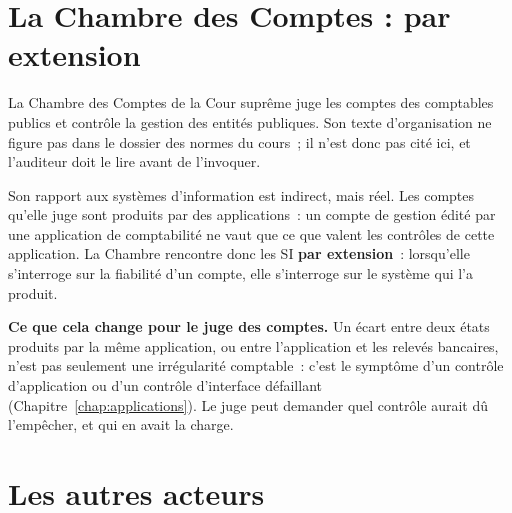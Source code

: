 \separateur

\section{La Chambre des Comptes : par extension}
\label{sec:c04-chambre}

La Chambre des Comptes de la Cour suprême juge les comptes des comptables
publics et contrôle la gestion des entités publiques. Son texte
d'organisation ne figure pas dans le dossier des normes du cours~; il
n'est donc pas cité ici, et l'auditeur doit le lire avant de l'invoquer.

Son rapport aux systèmes d'information est indirect, mais réel. Les
comptes qu'elle juge sont produits par des applications~: un compte de
gestion édité par une application de comptabilité ne vaut que ce que
valent les contrôles de cette application. La Chambre rencontre donc les
SI \textbf{par extension}~: lorsqu'elle s'interroge sur la fiabilité d'un
compte, elle s'interroge sur le système qui l'a produit.

\begin{boxinfo}
\textbf{Ce que cela change pour le juge des comptes.} Un écart entre deux
états produits par la même application, ou entre l'application et les
relevés bancaires, n'est pas seulement une irrégularité comptable~: c'est
le symptôme d'un contrôle d'application ou d'un contrôle d'interface
défaillant (Chapitre~\ref{chap:applications}). Le juge peut demander
quel contrôle aurait dû l'empêcher, et qui en avait la charge.
\end{boxinfo}

\separateur

\section{Les autres acteurs}
\label{sec:c04-autres}

